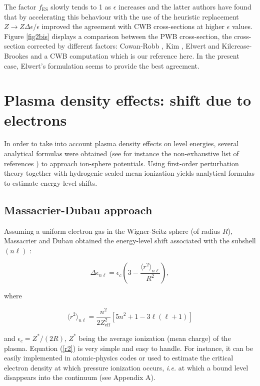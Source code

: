 \documentclass[a4paper,10pt]{article}
\begin{document}
\noindent The factor $f_{\mathrm{ES}}$ slowly tends to 1 as $\epsilon$ increases and the latter authors have found that by accelerating this behaviour with the use of the heuristic replacement $Z\rightarrow Z\Delta \epsilon/\epsilon$ improved the agreement with CWB cross-sections at higher $\epsilon$ values. Figure \ref{fig2bis} displays a comparison between the PWB cross-section, the cross-section corrected by different factors: Cowan-Robb \cite{COWAN81}, Kim \cite{KIM02a,KIM02b}, Elwert \cite{SOMMERFELD53,BIEDENHARN56,BETHE57} and Kilcrease-Brookes \cite{KILCREASE13} and a CWB computation \cite{ZHANG89} which is our reference here. In the present case, Elwert's formulation seems to provide the best agreement.

\section{Plasma density effects: shift due to electrons}\label{sec4}
In order to take into account plasma density effects on level energies, several analytical formulas were obtained (see for instance the non-exhaustive list of references \cite{LI12,MASSACRIER90,POIRIER15,BELKHIRI15}) to approach ion-sphere potentials. Using first-order perturbation theory together with hydrogenic scaled mean ionization yields analytical formulas to estimate energy-level shifts.

\subsection{Massacrier-Dubau approach}\label{subsec41}

Assuming a uniform electron gas in the Wigner-Seitz sphere (of radius $R$), Massacrier and Dubau obtained the energy-level shift associated with the subshell $(n\ell)$ \cite{MASSACRIER90}:

\begin{equation}\label{r2}
\Delta\epsilon_{n\ell}=\epsilon_c\left(3-\frac{\langle r^2\rangle_{n\ell}}{R^2}\right),
\end{equation}

\noindent where

\begin{equation}\label{squ}
\langle r^2\rangle_{n\ell}=\frac{n^2}{2Z_{\mathrm{eff}}^2}\left[5n^2+1-3\ell(\ell+1)\right]
\end{equation} 

\noindent and $\epsilon_c=Z^*/(2R)$, $Z^*$ being the average ionization (mean charge) of the plasma. Equation (\ref{r2}) is very simple and easy to handle. For instance, it can be easily implemented in atomic-physics codes \cite{JARRAH17,JARRAH19} or used to estimate the critical electron density at which pressure ionization occurs, \textit{i.e.} at which a bound level disappears into the continuum (see Appendix A).
\end{document}
